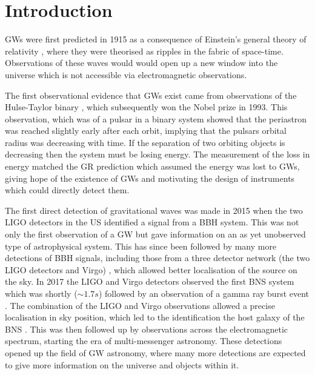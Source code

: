 \chapter{\label{intro}Introduction}


\Glspl{GW} were first predicted in 1915 as a consequence of Einstein's general
theory of relativity \citep{einstein2005GrundlageAllgemeinen}, where they were
theorised as ripples in the fabric of space-time.  Observations of these waves would would open up a new window into the universe which is not accessible via electromagnetic observations.

The first observational evidence that \glspl{GW} exist came from observations of the Hulse-Taylor
binary \citep{weisberg1981GravitationalWaves,weisberg2004RelativisticBinary}, which subsequently won the Nobel prize in 1993.
This observation, which was of a pulsar in a binary system showed that the periastron was
reached slightly early after each orbit, implying that the pulsars orbital radius was
decreasing with time.  If the separation of two orbiting objects is decreasing
then the system must be losing energy.  The measurement of the loss in energy matched the \gls{GR}
prediction which assumed the energy was lost to \glspl{GW}, giving hope of
the existence of \glspl{GW} and motivating the design of instruments
which could directly detect them.

The first direct detection of gravitational
waves was made in 2015 when the two \gls{LIGO} detectors in the US
\citep{abbott2016ObservationGravitational} identified a signal from a \gls{BBH}
system.  This was not only the first observation of a \gls{GW} but gave
information on an as yet unobserved type of astrophysical
system.  This has since been followed by many more detections of \gls{BBH}
signals, including those from a three detector network (the two \gls{LIGO} detectors and Virgo)
\citep{abbott2017GW170814ThreeDetector,theligoscientificcollaboration2020GW190425Observation}, which allowed better localisation of the source on the sky.  
In 2017 the \gls{LIGO} and Virgo detectors observed the
first \gls{BNS} system \citep{abbott2017GW170817Observation} which was shortly ($\sim 1.7s$) followed by an observation of a gamma ray burst event \citep{goldstein2017OrdinaryShort}.
The combination of the \gls{LIGO} and Virgo observations allowed a precise localisation in sky position, which led to the identification the host galaxy of the \gls{BNS} \citep{coulter2017SwopeSupernova}.
This was then followed up by observations across the electromagnetic spectrum, starting the era of multi-messenger astronomy.  
These detections opened up the field of
\gls{GW} astronomy, where many more detections are expected to give more
information on the universe and objects within it.

